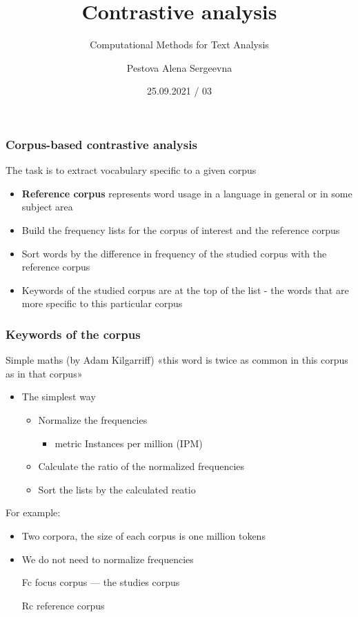 \documentclass[svgnames]{beamer}
\title[CMTA 03] %
{Contrastive analysis}
\subtitle
{Computational Methods for Text Analysis} %
\author%
{Pestova Alena Sergeevna}
\institute%
{НИУ ВШЭ Санкт-Петербург}
\date%
{25.09.2021 / 03}
\begin{document}
\begin{frame}
  \titlepage
\end{frame}


\begin{frame}
  \frametitle{Corpus-based contrastive analysis}
  The task is to extract vocabulary specific to a given corpus
  \begin{itemize}
  \item \textbf{Reference corpus} represents word usage in a language in general or in some subject area
  \item Build the frequency lists for the corpus of interest and the reference corpus
  \item Sort words by the difference in frequency of the studied corpus with the reference corpus
  \item Keywords of the studied corpus are at the top of the list - the words that are more specific to this particular corpus
  \end{itemize}
\end{frame}


\begin{frame}
  \frametitle{Keywords of the corpus}
  \begin{block}{Simple maths (by Adam Kilgarriff)}
  «this word is twice as common in this corpus as in that corpus»
\end{block}
\begin{itemize}
\item The simplest way
  \begin{itemize}
  \item Normalize the frequencies
    \begin{itemize}
    \item metric Instances per million (IPM)
    \end{itemize}
  \item Calculate the ratio of the normalized frequencies
  \item Sort the lists by the calculated reatio
  \end{itemize}
\end{itemize}
\end{frame}

\begin{frame}
  
For example:
\begin{itemize}
\item Two corpora, the size of each corpus is one million tokens
\item We do not need to normalize frequencies
\item[Fc] focus corpus — the studies corpus
\item[Rc] reference corpus
\end{itemize}
\end{frame}
\end{document}
